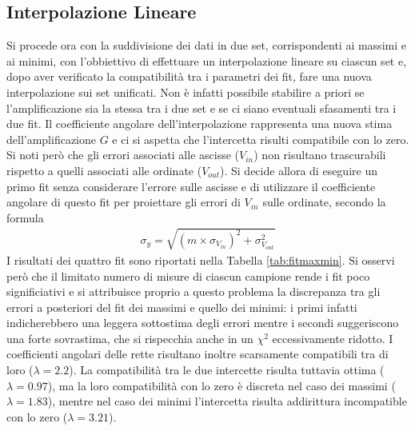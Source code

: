 \documentclass[a4paper,11pt]{article}
\begin{document}
\subsection{Interpolazione Lineare}
Si procede ora con la suddivisione dei dati in due set, corrispondenti ai massimi e ai minimi,
con l'obbiettivo di effettuare un interpolazione lineare su ciascun set e, dopo aver verificato
la compatibilità tra i parametri dei fit, fare una nuova interpolazione sui set unificati.
Non è infatti possibile stabilire a priori se l'amplificazione sia la stessa tra i due set
e se ci siano eventuali sfasamenti tra i due fit. Il coefficiente angolare dell'interpolazione
rappresenta una nuova stima dell'amplificazione $G$ e ci si aspetta che l'intercetta risulti
compatibile con lo zero.
Si noti però che gli errori associati alle ascisse ($V_{in}$) non risultano trascurabili rispetto a
quelli associati alle ordinate ($V_{out}$). Si decide allora di eseguire un primo fit senza considerare
l'errore sulle ascisse e di utilizzare il coefficiente angolare di questo fit per proiettare gli errori
di $V_{in}$ sulle ordinate, secondo la formula
\begin{align}\label{e:proiezione}
 \sigma_{y} = \sqrt{ (m \times \sigma_{V_{in}})^{2} + \sigma_{V_{out}}^{2}}
\end{align}
I risultati dei quattro fit sono riportati nella Tabella \ref{tab:fitmaxmin}. Si osservi però che il limitato numero
di misure di ciascun campione rende i fit poco significiativi e si attribuisce proprio a
questo problema la discrepanza tra gli errori a posteriori del fit dei massimi e quello dei
minimi: i primi infatti indicherebbero una leggera sottostima degli errori mentre i secondi
suggeriscono una forte sovrastima, che si rispecchia anche in un $\chi^{2}$ eccessivamente ridotto. I coefficienti angolari delle rette risultano inoltre scarsamente compatibili tra di loro ($\lambda = 2.2$). La compatibilità tra le due intercette risulta tuttavia ottima ($\lambda = 0.97$), ma la loro compatibilità con lo zero è discreta nel caso dei massimi ($\lambda = 1.83$), mentre nel caso dei minimi l'intercetta risulta addirittura incompatible
con lo zero ($\lambda = 3.21$).
\end{document}
